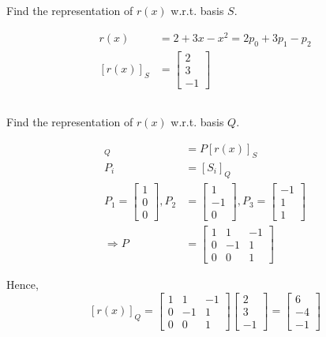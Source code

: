 \documentclass{article}
\theoremstyle{definition} %
\begin{document}
\subsection{}
Find the representation of $r(x)$ w.r.t. basis $S$.

\begin{align*}
    r(x) &= 2 + 3x- x^2 = 2p_0 + 3p_1 -p_2\\
    [r(x)]_S &= 
    \begin{bmatrix}
        2 \\ 3 \\ -1
    \end{bmatrix}
\end{align*}

\subsection{}
Find the representation of $r(x)$ w.r.t. basis $Q$.

\begin{align*}
    [r(x)]_Q &= P[r(x)]_S\\
    P_i &= [S_i]_Q\\
    P_1 = 
    \begin{bmatrix}
        1 \\ 0 \\ 0
    \end{bmatrix},
    P_2 &= 
    \begin{bmatrix}
        1 \\ -1 \\ 0
    \end{bmatrix},
    P_3 = 
    \begin{bmatrix}
        -1 \\ 1 \\ 1
    \end{bmatrix}
    \\
    \Rightarrow
    P &= 
    \begin{bmatrix}
        1 & 1 & -1\\
        0 & -1 & 1\\
        0 & 0 & 1
    \end{bmatrix}
\end{align*}

Hence, 
$$
[r(x)]_Q = 
\begin{bmatrix}
    1 & 1 & -1\\
    0 & -1 & 1\\
    0 & 0 & 1
\end{bmatrix}
\begin{bmatrix}
    2 \\ 3 \\ -1
\end{bmatrix}
=
\begin{bmatrix}
    6 \\ -4 \\ -1
\end{bmatrix}
$$
\end{document}
